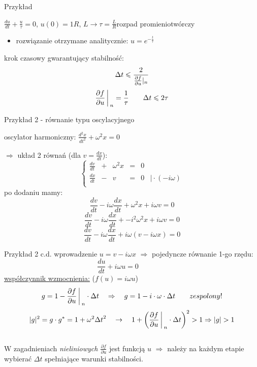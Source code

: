 \begin{frame}{Przykład}
	\begin{center}
	$\frac{du}{dt}+\frac{u}{\tau} = 0$, \quad $u(0) = 1$\newline $R$, $L\rightarrow \tau = \frac{L}{R}$\qquad rozpad promieniotwórczy\par
      \begin{itemize}
    \item rozwiązanie otrzymane analitycznie: $u = e^{-\frac{t}{\tau}}$
    \end{itemize}
	\end{center}
  
  krok czasowy gwarantujący stabilność:
  $$
  \Delta t \leqslant \frac{2}{\frac{\partial f}{\partial u}\arrowvert_n}$$
  $$\frac{\partial f}{\partial u}\bigg\arrowvert_n = \frac{1}{\tau}\qquad \Delta t \leqslant 2\tau$$
 
\end{frame}

\begin{frame}{Przykład 2 - równanie typu oscylacyjnego}
	\begin{center}
		oscylator harmoniczny: \qquad $\frac{d^2x}{dt^2}+ \omega^2x=0$
	\end{center}
    $\Rightarrow$ układ 2 równań (dla $v=\frac{dx}{dt}$):
    $$\left\{\begin{array}{lcclll}
	\frac{dv}{dt}&+&\omega^2x&=&0 &\\
	\frac{dx}{dt}&-&v&=&0 & \mid \cdot (-i \omega )\\
	\end{array} \right.$$
	po dodaniu mamy:
	$$ 	\frac{dv}{dt}-i \omega \frac{dx}{dt}+
	\omega^2 x+i \omega v  = 0$$
	$$ 	\frac{dv}{dt}-i \omega \frac{dx}{dt}+
	-i^2 \omega^2 x+i \omega v  = 0$$
	$$ 	\frac{dv}{dt}-i \omega \frac{dx}{dt}+
	i\omega( v-i\omega x ) = 0$$
	 \end{frame}
    \begin{frame}{Przykład 2 c.d.}
    wprowadzenie \underline{$u = v-i\omega x$} $\Rightarrow$ pojedyncze równanie 1-go rzędu:
    $$ \frac{du}{dt} + i\omega u= 0 \qquad  \qquad $$
\underline{współczynnik wzmocnienia:} ($f(u)=i\omega u$)
    $$g = 1-{\frac{\partial f}{\partial u}}\bigg\arrowvert _n \cdot \Delta t \quad \Rightarrow \quad g=1-i\cdot \omega \cdot \Delta t \qquad zespolony!$$
	$$|g|^2 = g \cdot g^* = 1+\omega^2 {\Delta t}^2 \quad \rightarrow \quad 1+\bigg(\frac{\partial f}{\partial u}\bigg{\arrowvert}_n \cdot \Delta t\bigg)^2 > 1 \Rightarrow |g| > 1 $$
  \\

    W zagadnieniach \textit{nieliniowych $\frac{\partial f}{\partial u}$} jest funkcją $u$ \quad $\Rightarrow$ \quad należy na każdym etapie wybierać $\Delta t$ spełniające warunki stabilności. 
\end{frame}
